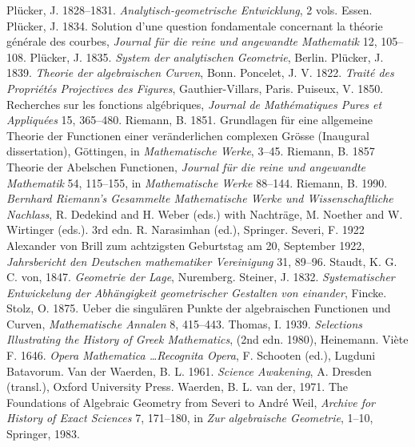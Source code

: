 \newline\indent Pl\"ucker, J. 1828--1831.  \emph{Analytisch-geometrische Entwicklung}, 2 vols. Essen. 
\newline\indent Pl\"ucker, J. 1834. Solution d'une question fondamentale concernant la th\'eorie g\'en\'erale des courbes, \emph{Journal f\"ur die reine und angewandte Mathematik} 12, 105--108.
\newline\indent Pl\"ucker, J. 1835. \emph{System der analytischen Geometrie}, Berlin.
\newline\indent Pl\"ucker, J. 1839. \emph{Theorie der algebraischen Curven}, Bonn.
\newline\indent Poncelet, J. V. 1822. \emph{Trait\'{e} des Propri\'{e}t\'{e}s Projectives des Figures}, Gauthier-Villars, Paris.
\newline\indent Puiseux, V. 1850. Recherches sur les fonctions alg\'ebriques, \emph{Journal de Math\'ematiques Pures et Appliqu\'ees} 15, 365--480.
\newline\indent Riemann, B. 1851.  Grundlagen f\"ur eine allgemeine Theorie der Functionen einer ver\-\"anderlichen complexen Gr\"osse (Inaugural dissertation), G\"ottingen, in \emph{Mathematische Werke}, 3--45.
 \newline\indent Riemann, B. 1857  Theorie der Abelschen Functionen, \emph{Journal f\"ur die reine und angewandte Mathematik}  54, 115--155, in \emph{Mathematische Werke} 88--144.
 \newline\indent  Riemann, B. 1990. \emph{Bernhard Riemann's Gesammelte Mathematische Werke und Wissen\-schaft\-liche Nachlass}, R. Dedekind and  H. Weber (eds.)  with Nach\-tr\"age, M. Noether and W. Wirtinger (eds.). 3rd edn. R. Narasimhan (ed.), Springer.
 \newline\indent Severi, F. 1922  Alexander von Brill zum achtzigsten Geburtstag am 20, September 1922, \emph{Jahrsbericht den Deutschen mathematiker Vereinigung} 31, 89--96.
  \newline\indent Staudt, K. G. C. von, 1847. \emph{Geometrie der Lage}, Nuremberg.
\newline\indent   Steiner, J. 1832. \emph{Systematischer Entwickelung der Abh\"angigkeit geometri\-scher Gestalten von einander}, Fincke.
 \newline\indent Stolz, O.  1875. Ueber die singul\"aren Punkte der algebraischen Functionen und Curven, \emph{Mathematische Annalen} 8, 415--443. 
\newline\indent Thomas, I. 1939. \emph{Selections Illustrating the History of Greek Mathematics}, (2nd edn. 1980), Heinemann.
 \newline\indent Vi\`ete  F. 1646.  \emph{Opera Mathematica \ldots Recognita Opera}, F.  Schooten (ed.), Lugduni Batavorum.
\newline\indent Van der Waerden, B. L. 1961. \emph{Science Awakening}, A. Dresden (transl.), Oxford University Press.
\newline\indent Waerden, B. L. van der, 1971.  The Foundations of Algebraic Geometry from Severi to Andr{\'e} Weil, \emph{Archive for History of Exact Sciences} 7,  171--180, in  \emph{Zur algebraische Geometrie},  1--10, Springer, 1983.
 \normalsize
 
\endgroup
 


%

